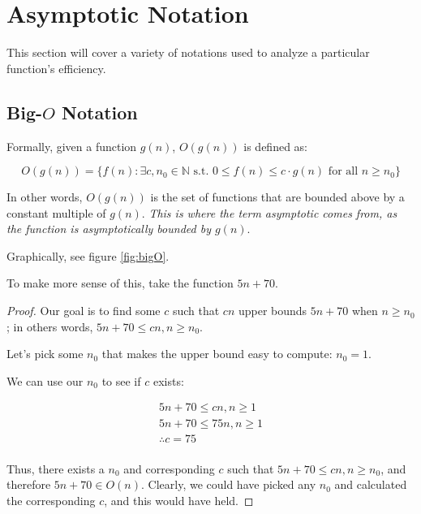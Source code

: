 \documentclass[12pt]{article}
\begin{document}
\section{Asymptotic Notation}

This section will cover a variety of notations used to analyze a particular function's efficiency.

\subsection{\texorpdfstring{Big-$O$ Notation}{TEXT}}

Formally, given a function $g(n)$, $O(g(n))$ is defined as:

\begin{equation}
    O(g(n)) = \{f(n): \exists c, n_0 \in \mathbb{N} \text{ s.t. } 0 \leq f(n) \leq c \cdot g(n) \text{ for all } n \geq n_0\}
\end{equation}

In other words, $O(g(n))$ is the set of functions that are bounded above by a constant multiple of $g(n)$. \textit{This is where the term asymptotic comes from, as the function is asymptotically bounded by $g(n)$}.

Graphically, see figure \ref{fig:bigO}.


To make more sense of this, take the function $5n+70$. 

\begin{proof}
    Our goal is to find some $c$ such that $cn$ upper bounds $5n+70$ when $n\geq n_0$; in others words, $5n+70 \leq cn, n \geq n_0$.

    Let's pick some $n_0$ that makes the upper bound easy to compute: $n_0 = 1$. 
    
    We can use our $n_0$ to see if $c$ exists:

    \begin{equation}
        \begin{split}
            5n + 70 \leq cn, n \geq 1 \\
            5n + 70 \leq 75n, n \geq 1 \\
            \therefore c = 75\\
        \end{split}
    \end{equation}

    Thus, there exists a $n_0$ and corresponding $c$ such that $5n+70 \leq cn, n \geq n_0$, and therefore $5n+70 \in O(n)$. Clearly, we could have picked any $n_0$ and calculated the corresponding $c$, and this would have held.
\end{proof}
\end{document}
